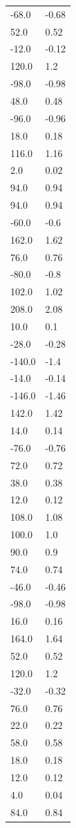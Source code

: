 \begin{longtable}{ll}
-68.0 & -0.68 \\
52.0 & 0.52 \\
-12.0 & -0.12 \\
120.0 & 1.2 \\
-98.0 & -0.98 \\
48.0 & 0.48 \\
-96.0 & -0.96 \\
18.0 & 0.18 \\
116.0 & 1.16 \\
2.0 & 0.02 \\
94.0 & 0.94 \\
94.0 & 0.94 \\
-60.0 & -0.6 \\
162.0 & 1.62 \\
76.0 & 0.76 \\
-80.0 & -0.8 \\
102.0 & 1.02 \\
208.0 & 2.08 \\
10.0 & 0.1 \\
-28.0 & -0.28 \\
-140.0 & -1.4 \\
-14.0 & -0.14 \\
-146.0 & -1.46 \\
142.0 & 1.42 \\
14.0 & 0.14 \\
-76.0 & -0.76 \\
72.0 & 0.72 \\
38.0 & 0.38 \\
12.0 & 0.12 \\
108.0 & 1.08 \\
100.0 & 1.0 \\
90.0 & 0.9 \\
74.0 & 0.74 \\
-46.0 & -0.46 \\
-98.0 & -0.98 \\
16.0 & 0.16 \\
164.0 & 1.64 \\
52.0 & 0.52 \\
120.0 & 1.2 \\
-32.0 & -0.32 \\
76.0 & 0.76 \\
22.0 & 0.22 \\
58.0 & 0.58 \\
18.0 & 0.18 \\
12.0 & 0.12 \\
4.0 & 0.04 \\
84.0 & 0.84 \\

\end{longtable}
